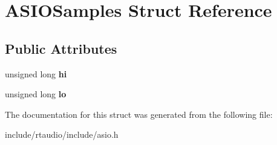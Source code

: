 \hypertarget{struct_a_s_i_o_samples}{}\section{A\+S\+I\+O\+Samples Struct Reference}
\label{struct_a_s_i_o_samples}
\subsection*{Public Attributes}
\begin{DoxyCompactItemize}
\item 
unsigned long {\bfseries hi}\hypertarget{struct_a_s_i_o_samples_aeaff699b3510dfe6532ccae98e1e7cec}{}\label{struct_a_s_i_o_samples_aeaff699b3510dfe6532ccae98e1e7cec}

\item 
unsigned long {\bfseries lo}\hypertarget{struct_a_s_i_o_samples_aab9757a9a497b781f5d553fe7e497e69}{}\label{struct_a_s_i_o_samples_aab9757a9a497b781f5d553fe7e497e69}

\end{DoxyCompactItemize}


The documentation for this struct was generated from the following file\+:\begin{DoxyCompactItemize}
\item 
include/rtaudio/include/asio.\+h\end{DoxyCompactItemize}
